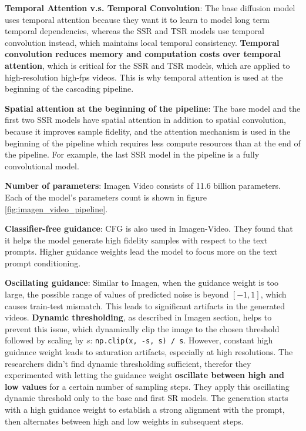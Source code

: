 \textbf{Temporal Attention v.s. Temporal Convolution}: The base diffusion model uses temporal attention because they want it to learn to model long term temporal dependencies, whereas the SSR and TSR models use temporal convolution instead, which maintains local temporal consistency. \textbf{Temporal convolution reduces memory and computation costs over temporal attention}, which is critical for the SSR and TSR models, which are applied to high-resolution high-fps videos. This is why temporal attention is used at the beginning of the cascading pipeline.

\textbf{Spatial attention at the beginning of the pipeline}: The base model and the first two SSR models have spatial attention in addition to spatial convolution, because it improves sample fidelity, and the attention mechanism is used in the beginning of the pipeline which requires less compute resources than at the end of the pipeline. For example, the last SSR model in the pipeline is a fully convolutional model.

\textbf{Number of parameters}: Imagen Video consists of 11.6 billion parameters. Each of the model's parameters count is shown in figure \ref{fig:imagen_video_pipeline}.

\textbf{Classifier-free guidance}: CFG is also used in Imagen-Video. They found that it helps the model generate high fidelity samples with respect to the text prompts. Higher guidance weights lead the model to focus more on the text prompt conditioning.

\textbf{Oscillating guidance}: Similar to Imagen, when the guidance weight is too large, the possible range of values of predicted noise is beyond $[-1, 1]$, which causes train-test mismatch. This leads to significant artifacts in the generated videos. \textbf{Dynamic thresholding}, as described in Imagen section, helps to prevent this issue, which dynamically clip the image to the chosen threshold followed by scaling by $s$: \texttt{np.clip(x, -s, s) / s}. However, constant high guidance weight leads to saturation artifacts, especially at high resolutions. The researchers didn't find dynamic thresholding sufficient, therefor they experimented with letting the guidance weight \textbf{oscillate between high and low values} for a certain number of sampling steps. They apply this oscillating dynamic threshold only to the base and first SR models. The generation starts with a high guidance weight to establish a strong alignment with the prompt, then alternates between high and low weights in subsequent steps.













